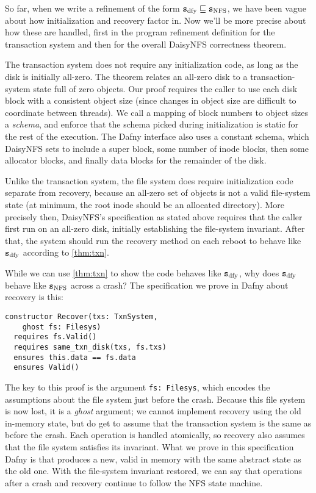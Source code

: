 So far, when we write a refinement of the form $\texttt{s}_{\mathrm{dfy}} \sqsubseteq \texttt{s}_{\mathrm{NFS}}$, we have
been vague about how initialization and recovery factor in. Now we'll
be more precise about how these are handled, first in the program refinement
definition for the transaction system and then for the overall DaisyNFS
correctness theorem.

The transaction system does not require any initialization code, as long as the
disk is initially all-zero. The theorem relates an all-zero disk to a
transaction-system state full of zero objects. Our proof requires the caller to
use each disk block with a consistent object size (since changes in object size
are difficult to coordinate between threads). We call a mapping of block numbers
to object sizes a \emph{schema}, and enforce that the schema picked during
initialization is static for the rest of the execution. The Dafny interface also
uses a constant schema, which DaisyNFS sets to include a super block, some
number of inode blocks, then some allocator blocks, and finally data blocks
for the remainder of the disk.

Unlike the transaction system, the file system does require initialization code
separate from recovery, because an all-zero set of objects is not a valid
file-system state (at minimum, the root inode should be an allocated directory).
More precisely then, DaisyNFS's specification as stated above requires that the
caller first run  on an all-zero disk, initially establishing the
file-system invariant. After that, the system should run the recovery method on
each reboot to behave like $\texttt{s}_{\mathrm{dfy}}$ according to \cref{thm:txn}.

While we can use \cref{thm:txn} to show the code behaves like $\texttt{s}_{\mathrm{dfy}}$, why
does $\texttt{s}_{\mathrm{dfy}}$ behave like $\texttt{s}_{\mathrm{NFS}}$ across a crash? The specification we prove in
Dafny about recovery is this:

\begin{verbatim}
constructor Recover(txs: TxnSystem,
    ghost fs: Filesys)
  requires fs.Valid()
  requires same_txn_disk(txs, fs.txs)
  ensures this.data == fs.data
  ensures Valid()
\end{verbatim}

The key to this proof is the argument \texttt{fs: Filesys}, which encodes the
assumptions about the file system just before the crash. Because this file
system is now lost, it is a \emph{ghost} argument; we cannot implement recovery
using the
old in-memory state, but do get to assume that the transaction system 
is the same as before the crash. Each operation is handled
atomically, so recovery also assumes that the file system satisfies its
 invariant. What we prove in this specification Dafny
is that  produces a new, valid  in memory with the
same abstract state as the old one. With the file-system invariant restored, we
can say that operations after a crash and recovery continue to follow the NFS
state machine.

